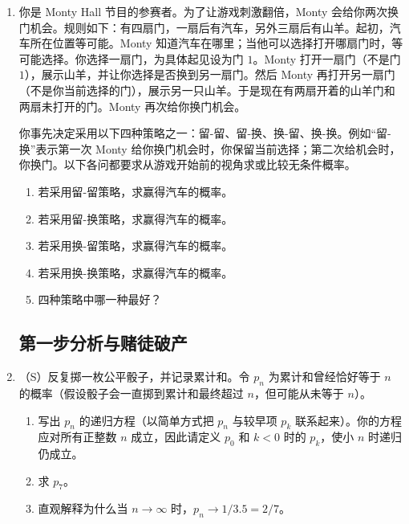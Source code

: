 \documentclass[UTF8,12pt,a4paper,fontset=fandol]{ctexart}
\begin{document}
\begin{enumerate}
  Monty 知道每扇门后的奖品，会打开一扇门（不是参赛者最初选择的门），然后让参赛者选择是否换到另一扇未打开门。Monty 以概率 $p$ 展示（在参赛者最初未选中的 $3$ 扇门中）最不受偏好的奖品，以概率 $1-p$ 展示中间偏好的奖品，绝不展示最受偏好的奖品。

  参赛者事先决定采用如下策略：最初选门 $1$。Monty 开门后，在其余两扇未打开门中随机选择一扇换过去（各以概率 $1/2$）。
  \begin{enumerate}
    \item 求参赛者得到汽车的无条件概率。

    提示：以汽车所在位置为条件。
    \item 求 Monty 展示苹果的无条件概率。

    提示：以门 $1$ 后的奖品为条件。
    \item Monty 现在打开一扇门，展示苹果。给定这一信息，求参赛者得到汽车的条件概率。
  \end{enumerate}

  \item 你是 Monty Hall 节目的参赛者。为了让游戏刺激翻倍，Monty 会给你两次换门机会。规则如下：有四扇门，一扇后有汽车，另外三扇后有山羊。起初，汽车所在位置等可能。Monty 知道汽车在哪里；当他可以选择打开哪扇门时，等可能选择。你选择一扇门，为具体起见设为门 $1$。Monty 打开一扇门（不是门 $1$），展示山羊，并让你选择是否换到另一扇门。然后 Monty 再打开另一扇门（不是你当前选择的门），展示另一只山羊。于是现在有两扇开着的山羊门和两扇未打开的门。Monty 再次给你换门机会。

  你事先决定采用以下四种策略之一：留-留、留-换、换-留、换-换。例如“留-换”表示第一次 Monty 给你换门机会时，你保留当前选择；第二次给机会时，你换门。以下各问都要求从游戏开始前的视角求或比较无条件概率。
  \begin{enumerate}
    \item 若采用留-留策略，求赢得汽车的概率。
    \item 若采用留-换策略，求赢得汽车的概率。
    \item 若采用换-留策略，求赢得汽车的概率。
    \item 若采用换-换策略，求赢得汽车的概率。
    \item 四种策略中哪一种最好？
  \end{enumerate}

\subsection*{第一步分析与赌徒破产}

  \item （S）反复掷一枚公平骰子，并记录累计和。令 $p_n$ 为累计和曾经恰好等于 $n$ 的概率（假设骰子会一直掷到累计和最终超过 $n$，但可能从未等于 $n$）。
  \begin{enumerate}
    \item 写出 $p_n$ 的递归方程（以简单方式把 $p_n$ 与较早项 $p_k$ 联系起来）。你的方程应对所有正整数 $n$ 成立，因此请定义 $p_0$ 和 $k<0$ 时的 $p_k$，使小 $n$ 时递归仍成立。
    \item 求 $p_7$。
    \item 直观解释为什么当 $n\to\infty$ 时，$p_n\to 1/3.5=2/7$。
  \end{enumerate}


\end{enumerate}
\end{document}
